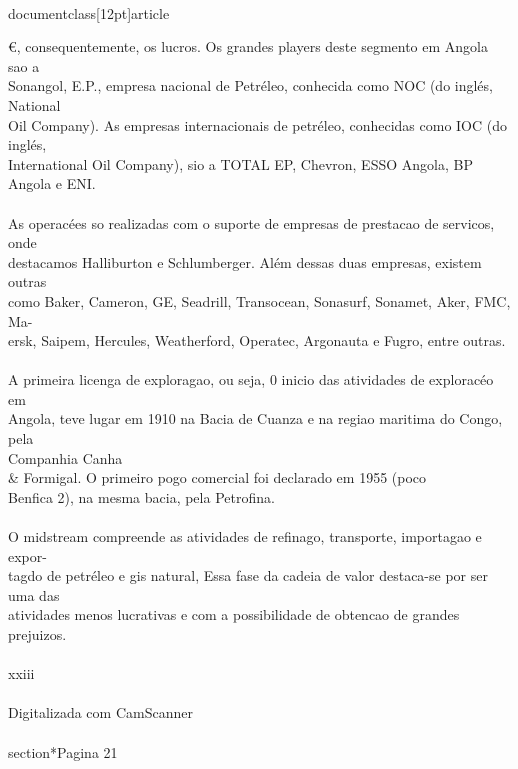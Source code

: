 \\documentclass[12pt]{article}
\begin{document}
{€, consequentemente, os lucros. Os grandes players deste segmento em Angola sao a\\
Sonangol, E.P., empresa nacional de Petréleo, conhecida como NOC (do inglés, National\\
Oil Company). As empresas internacionais de petréleo, conhecidas como IOC (do inglés,\\
International Oil Company), sio a TOTAL EP, Chevron, ESSO Angola, BP Angola e ENI.\\
\\
As operacées so realizadas com o suporte de empresas de prestacao de servicos, onde\\
destacamos Halliburton e Schlumberger. Além dessas duas empresas, existem outras\\
como Baker, Cameron, GE, Seadrill, Transocean, Sonasurf, Sonamet, Aker, FMC, Ma-\\
ersk, Saipem, Hercules, Weatherford, Operatec, Argonauta e Fugro, entre outras.\\
\\
A primeira licenga de exploragao, ou seja, 0 inicio das atividades de exploracéo em\\
Angola, teve lugar em 1910 na Bacia de Cuanza e na regiao maritima do Congo, pela\\
Companhia Canha \\& Formigal. O primeiro pogo comercial foi declarado em 1955 (poco\\
Benfica 2), na mesma bacia, pela Petrofina.\\
\\
O midstream compreende as atividades de refinago, transporte, importagao e expor-\\
tagdo de petréleo e gis natural, Essa fase da cadeia de valor destaca-se por ser uma das\\
atividades menos lucrativas e com a possibilidade de obtencao de grandes prejuizos.\\
\\
xxiii\\
\\
Digitalizada com CamScanner\\

\\section*{Pagina 21}

}
\end{document}
